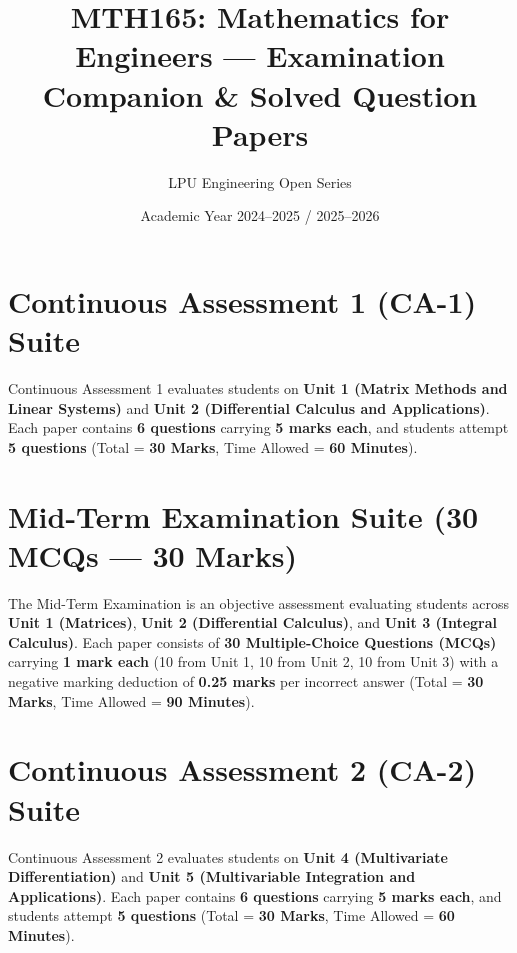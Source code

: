 \documentclass[a4paper,11pt,oneside,openany]{book}
\title{MTH165: Mathematics for Engineers --- Examination Companion \& Solved Question Papers}
\author{LPU Engineering Open Series}
\date{Academic Year 2024--2025 / 2025--2026}
\begin{document}
\frontmatter




\tableofcontents
\newpage

\mainmatter

\chapter{Continuous Assessment 1 (CA-1) Suite}
\label{chap:ca1}
\noindent
Continuous Assessment 1 evaluates students on \textbf{Unit 1 (Matrix Methods and Linear Systems)} and \textbf{Unit 2 (Differential Calculus and Applications)}. Each paper contains \textbf{6 questions} carrying \textbf{5 marks each}, and students attempt \textbf{5 questions} (Total = \textbf{30 Marks}, Time Allowed = \textbf{60 Minutes}).

\newpage




\chapter{Mid-Term Examination Suite (30 MCQs --- 30 Marks)}
\label{chap:midterm}
\noindent
The Mid-Term Examination is an objective assessment evaluating students across \textbf{Unit 1 (Matrices)}, \textbf{Unit 2 (Differential Calculus)}, and \textbf{Unit 3 (Integral Calculus)}. Each paper consists of \textbf{30 Multiple-Choice Questions (MCQs)} carrying \textbf{1 mark each} (10 from Unit 1, 10 from Unit 2, 10 from Unit 3) with a negative marking deduction of \textbf{0.25 marks} per incorrect answer (Total = \textbf{30 Marks}, Time Allowed = \textbf{90 Minutes}).

\newpage




\chapter{Continuous Assessment 2 (CA-2) Suite}
\label{chap:ca2}
\noindent
Continuous Assessment 2 evaluates students on \textbf{Unit 4 (Multivariate Differentiation)} and \textbf{Unit 5 (Multivariable Integration and Applications)}. Each paper contains \textbf{6 questions} carrying \textbf{5 marks each}, and students attempt \textbf{5 questions} (Total = \textbf{30 Marks}, Time Allowed = \textbf{60 Minutes}).
\end{document}
